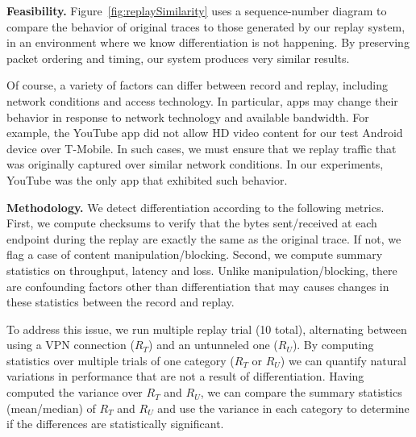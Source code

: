 



\noindent\textbf{Feasibility.}
Figure~\ref{fig:replaySimilarity} uses a sequence-number diagram to compare the behavior of original traces 
to those generated by our replay system, in an environment where we know differentiation is not happening. 
By preserving packet ordering and timing, our system produces very similar results. 


Of course, a variety of factors can differ between record and replay, including network 
conditions and access technology. In particular, apps may change their behavior in response 
to network technology and available bandwidth. For example, the YouTube app did not  
allow HD video content for our test Android device over T-Mobile. In such cases, we must ensure that we replay 
traffic that was originally captured over similar network conditions. 
In our experiments, YouTube was the only app that exhibited such behavior.





\noindent\textbf{Methodology.} We detect differentiation according to the following metrics. First, we 
compute checksums to verify that the bytes sent/received at each endpoint during the replay are 
exactly the same as the original trace. If not, we flag a case of content manipulation/blocking. Second, we
compute summary statistics on throughput, latency and loss. Unlike manipulation/blocking, there are 
confounding factors other than differentiation that may causes changes in these statistics between the 
record and replay.

To address this issue, we run multiple replay trial (10 total), alternating between using a VPN connection ($R_T$) and 
an untunneled one ($R_U$). By computing statistics over multiple trials of one category ($R_T$ or $R_U$) we can quantify 
natural variations in performance that are not a result of differentiation. Having computed the variance over $R_T$ and $R_U$, we can 
compare the summary statistics (mean/median) of $R_T$ and $R_U$ and use the variance in each category 
to determine if the differences are statistically significant.

